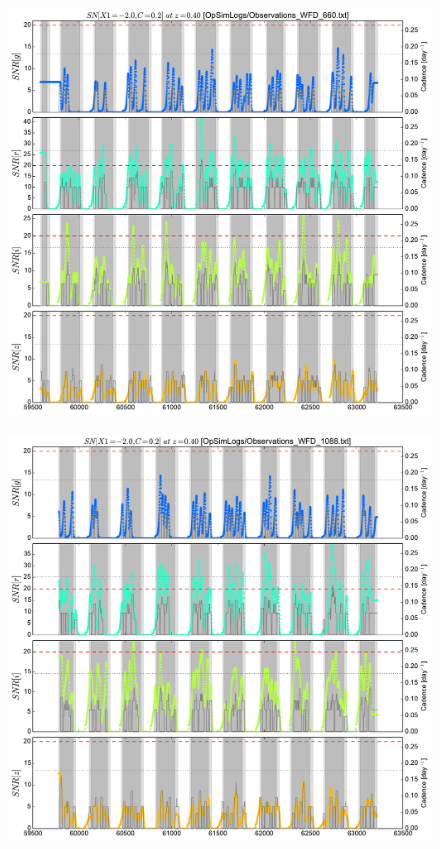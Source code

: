 \documentclass[\docopts]{\docclass}
\begin{document}
\begin{figure}[t]
  \begin{center}
    \includegraphics[width=\linewidth]{metric_WFD_660.pdf}
    \caption{}
  \end{center}
\end{figure}

\begin{figure}[t]
  \begin{center}
    \includegraphics[width=\linewidth]{metric_WFD_1088.pdf}
    \caption{}
  \end{center}
\end{figure}
\end{document}
